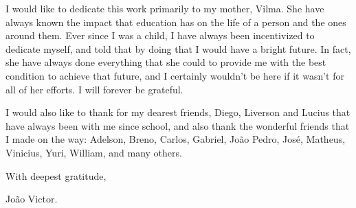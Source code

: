 
I would like to dedicate this work primarily to my mother, Vilma. She have always known the impact that education has on the life of a person and the ones around them. Ever since I was a child, I have always been incentivized to dedicate myself, and told that by doing that I would have a bright future. In fact, she have always done everything that she could to provide me with the best condition to achieve that future, and I certainly wouldn't be here if it wasn't for all of her efforts. I will forever be grateful.

I would also like to thank for my dearest friends, Diego, Liverson and Lucius that have always been with me since school, and also thank the wonderful friends that I made on the way: Adelson, Breno, Carlos, Gabriel, João Pedro, José, Matheus, Vinicius, Yuri, William, and many others.

With deepest gratitude, 

João Victor.